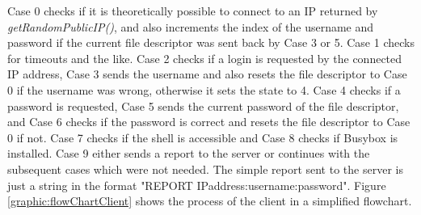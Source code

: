 Case 0 checks if it is theoretically possible to connect to an IP returned by \textit{getRandomPublicIP()}, and also increments the index of the username and password if the current file descriptor was sent back by Case 3 or 5. Case 1 checks for timeouts and the like. Case 2 checks if a login is requested by the connected IP address, Case 3 sends the username and also resets the file descriptor to Case 0 if the username was wrong, otherwise it sets the state to 4. Case 4 checks if a password is requested, Case 5 sends the current password of the file descriptor, and Case 6 checks if the password is correct and resets the file descriptor to Case 0 if not. Case 7 checks if the shell is accessible and Case 8 checks if Busybox is installed. Case 9 either sends a report to the server or continues with the subsequent cases which were not needed. The simple report sent to the server is just a string in the format "REPORT IPaddress:username:password". 
Figure \ref{graphic:flowChartClient} shows the process of the client in a simplified flowchart. 


